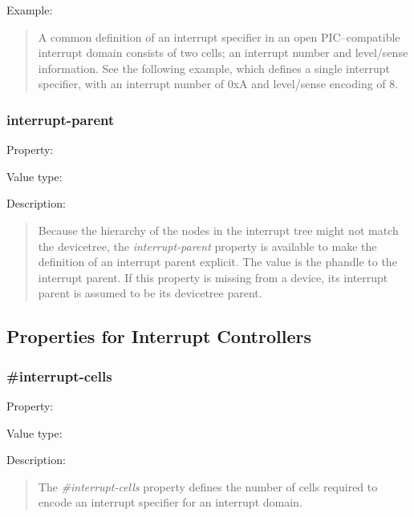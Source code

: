 \documentclass[a4paper,10pt,oneside]{sphinxmanual}
\begin{document}
Example:
\begin{quote}

A common definition of an interrupt specifier in an open PIC–compatible
interrupt domain consists of two cells; an interrupt number and
level/sense information. See the following example, which defines a
single interrupt specifier, with an interrupt number of 0xA and
level/sense encoding of 8.
\begin{quote}

\end{quote}
\end{quote}


\subsubsection{interrupt-parent}
\label{devicetree-basics:interrupt-parent}
Property: 

Value type: 

Description:
\begin{quote}

Because the hierarchy of the nodes in the interrupt tree might not match
the devicetree, the \emph{interrupt-parent} property is available to make
the definition of an interrupt parent explicit. The value is the phandle
to the interrupt parent. If this property is missing from a device, its
interrupt parent is assumed to be its devicetree parent.
\end{quote}


\subsection{Properties for Interrupt Controllers}
\label{devicetree-basics:properties-for-interrupt-controllers}

\subsubsection{\#interrupt-cells}
\label{devicetree-basics:interrupt-cells}
Property: 

Value type: 

Description:
\begin{quote}

The \emph{\#interrupt-cells} property defines the number of cells required to
encode an interrupt specifier for an interrupt domain.
\end{quote}
\end{document}

